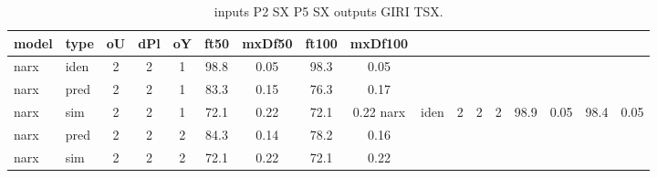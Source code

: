 \begin{center} 
\begin{longtable}{ll|ccc|cc|cc} 
\caption[inputs P2 SX P5 SX   outputs GIRI TSX]{inputs P2 SX P5 SX   outputs GIRI TSX.} 
\label{tab:inputs_P2_SX_P5_SX___outputs_GIRI_TSX} 
\hline 
  model & type & oU & dPl & oY & ft50 & mxDf50 & ft100 & mxDf100 \\ 
 \hline 
narx & iden & 2 & 2 & 1 & 98.8 & 0.05 & 98.3 & 0.05 \\ 
narx & pred & 2 & 2 & 1 & 83.3 & 0.15 & 76.3 & 0.17 \\ 
narx & sim  & 2 & 2 & 1 & 72.1 & 0.22 & 72.1 & 0.22 
 \hline 
narx & iden & 2 & 2 & 2 & 98.9 & 0.05 & 98.4 & 0.05 \\ 
narx & pred & 2 & 2 & 2 & 84.3 & 0.14 & 78.2 & 0.16 \\ 
narx & sim  & 2 & 2 & 2 & 72.1 & 0.22 & 72.1 & 0.22 
 \hline 
\end{longtable} 
\end{center}